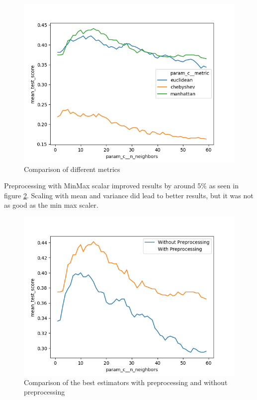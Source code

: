 \begin{figure}[H]
  \begin{center}
    \includegraphics[width=\linewidth]{amazon/plots/knn_metrics.png}
    \caption{Comparison of different metrics}
    \label{fig:amazon-knn-metric-comparison}
  \end{center}
\end{figure}

Preprocessing with MinMax scalar improved results by around 5\% as seen in figure \ref{fig:amazon-knn-comparison}. Scaling with mean and variance did lead to better results, but it was not as good as the min max scaler.

\begin{figure}[H]
  \begin{center}
    \includegraphics[width=\linewidth]{amazon/plots/knn_comparison.png}
    \caption{Comparison of the best estimators with preprocessing and without preprocessing}
    \label{fig:amazon-knn-comparison}
  \end{center}
\end{figure}


